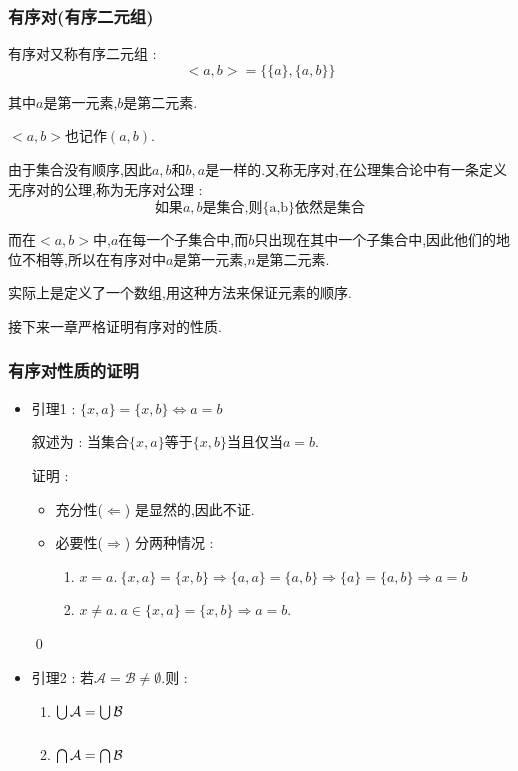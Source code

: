 {{\subsubsection{有序对(有序二元组)}{
  有序对又称有序二元组 : $$
    <a,b> = \{\{a\},\{a,b\}\}
  $$

  其中$a$是第一元素,$b$是第二元素.

  $<a,b>$也记作$(a,b)$.

  由于集合没有顺序,因此${a,b}$和${b,a}$是一样的.又称无序对,在公理集合论中有一条定义无序对的公理,称为无序对公理 : $$
    \mbox{如果$a,b$是集合,则\{a,b\}依然是集合}
  $$

  而在$<a,b>$中,$a$在每一个子集合中,而$b$只出现在其中一个子集合中,因此他们的地位不相等,所以在有序对中$a$是第一元素,$n$是第二元素.

  实际上是定义了一个数组,用这种方法来保证元素的顺序.

  接下来一章严格证明有序对的性质.
}%

\subsubsection{有序对性质的证明}{
  \begin{itemize}
    \item {
          引理1 : $\{x,a\} = \{x,b\} \Leftrightarrow a = b$

          叙述为 : 当集合$\{x,a\}$等于$\{x,b\}$当且仅当$a = b$.

          证明 : \begin{itemize}
            \item 充分性($\Leftarrow$) 是显然的,因此不证.
            \item 必要性($\Rightarrow$) 分两种情况 : \begin{enumerate}
                    \item $x = a.\ \{x,a\} = \{x,b\} \Rightarrow \{a,a\} = \{a,b\} \Rightarrow \{a\} = \{a,b\} \Rightarrow a = b$
                    \item $x \neq a.\ a \in \{x,a\} = \{x,b\} \Rightarrow a = b$.
                  \end{enumerate}
          \end{itemize}

          \qed
          }
    \item {
          引理2 : 若$\mathcal{A} = \mathcal{B} \neq \emptyset$.则 : \begin{enumerate}
            \item $\bigcup\limits_{~}^{~}\mathcal{A} = \bigcup\limits_{~}^{~}\mathcal{B}$
            \item $\bigcap\limits_{~}^{~}\mathcal{A} = \bigcap\limits_{~}^{~}\mathcal{B}$
          \end{enumerate}

}
\end{itemize}}}}
